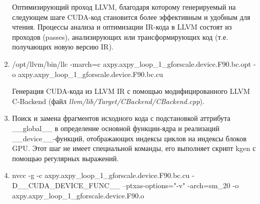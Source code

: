 \documentclass[a4,12pt]{report}
\begin{document}
\begin{enumerate}
Оптимизирующий проход LLVM, благодаря которому генерируемый на
следующем шаге CUDA-код становится более эффективным и удобным для чтения.
Процессы анализа и оптимизации IR-кода в LLVM состоят из проходов (passes),
анализирующих или трансформирующих код (т.е. получающих новую версию IR).

\item

\begin{code}
/opt/llvm/bin/llc -march=c axpy.axpy_loop_1_gforscale.device.F90.bc.opt
-o axpy.axpy_loop_1_gforscale.device.F90.bc.cu
\end{code}

Генерация CUDA-кода из LLVM IR с помощью модифицированного LLVM C-Backend (файл \emph{llvm/lib/Target/CBackend/CBackend.cpp}).

\item Поиск и замена фрагментов исходного кода с подстановкой аттрибута \_\_global\_\_ в определение основной функции-ядра и реализаций \_\_device\_\_-функций, отображающих индексы циклов на индексы блоков GPU. Этот шаг не имеет специальной команды, его выполняет скрипт kgen с помощью регулярных выражений.


\item

\begin{code}
nvcc -g -c axpy.axpy_loop_1_gforscale.device.F90.bc.cu 
-D__CUDA_DEVICE_FUNC__ --ptxas-options="-v" -arch=sm_20 -o
axpy.axpy_loop_1_gforscale.device.F90.o
\end{code}


\end{enumerate}
\end{document}
